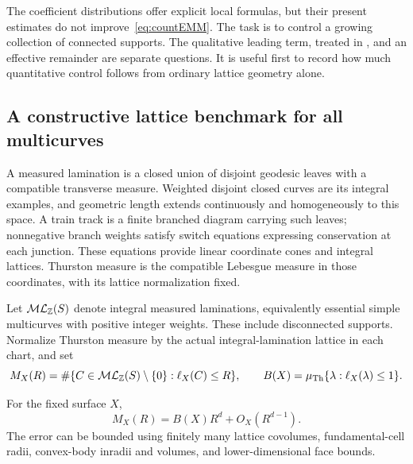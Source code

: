 The coefficient distributions offer explicit local formulas, but
their present estimates do not improve~\eqref{eq:countEMM}.
The task is to control a growing collection of connected supports.
The qualitative leading term, treated in
\cite{MirzSimple,RivinSimpleAsymptotics}, and an effective remainder
are separate questions.  It is useful first to record how much
quantitative control follows from ordinary lattice geometry alone.

\subsection{A constructive lattice benchmark for all multicurves}
\label{subsec:countlattice}

A measured lamination is a closed union of disjoint geodesic leaves
with a compatible transverse measure. Weighted disjoint closed
curves are its integral examples, and geometric length extends
continuously and homogeneously to this space. A train track is a
finite branched diagram carrying such leaves; nonnegative branch
weights satisfy switch equations expressing conservation at each
junction. These equations provide linear coordinate cones and
integral lattices. Thurston measure is the compatible Lebesgue
measure in those coordinates, with its lattice normalization fixed.

Let $\mathcal{ML}_{\mathbb Z}(S)$ denote integral measured laminations,
equivalently essential simple multicurves with positive integer
weights.  These include disconnected supports.  Normalize Thurston
measure by the actual integral-lamination lattice in each chart, and
set
\[
 M_X(R)=\#\{C\in\mathcal{ML}_{\mathbb Z}(S)\setminus\{0\}:
                  \ell_X(C)\leq R\},\qquad
 B(X)=\mu_{\mathrm{Th}}\{\lambda:\ell_X(\lambda)\leq1\}.
\]

\begin{proposition}
\label{prop:countall}
For the fixed surface $X$,
\begin{equation}
 \boxed{M_X(R)=B(X)R^d+O_X(R^{d-1}).}
 \label{eq:countall}
\end{equation}
The error can be bounded using finitely many lattice covolumes,
fundamental-cell radii, convex-body inradii and volumes, and
lower-dimensional face bounds.
\end{proposition}

